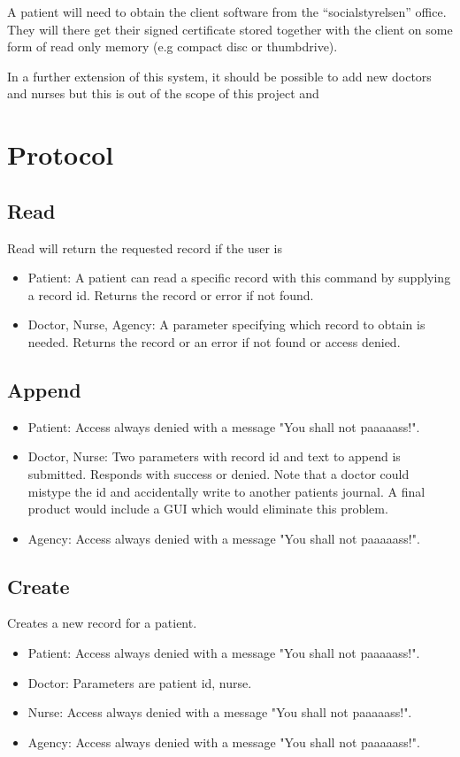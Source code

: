 \documentclass[10pt, a4paper]{article}
\begin{document}
A patient will need to obtain the client software from the ``socialstyrelsen'' office. They will there get their signed certificate stored together with the client on some form of read only memory (e.g compact disc or thumbdrive).

In a further extension of this system, it should be possible to add new doctors and nurses but this is out of the scope
of this project and 


\section{Protocol}
\subsection{Read}
Read will return the requested record if the user is 
\begin{itemize}
	\item Patient: A patient can read a specific record with this command by supplying a record id. Returns the record or error if not found.
	\item Doctor, Nurse, Agency: A parameter specifying which record to obtain is needed. Returns the record or an error if not found or access denied.
\end{itemize}

\subsection{Append}
\begin{itemize}
\item Patient: Access always denied with a message "You shall not paaaaass!".
\item Doctor, Nurse: Two parameters with record id and text to append is submitted. Responds with success or denied. Note that a doctor could mistype the id and accidentally write to another patients journal. A final product would include a GUI which would eliminate this problem.
\item Agency: Access always denied with a message "You shall not paaaaass!".
\end{itemize}

\subsection{Create}
Creates a new record for a patient.
\begin{itemize}
\item Patient: Access always denied with a message "You shall not paaaaass!".
\item Doctor: Parameters are patient id, nurse.
\item Nurse: Access always denied with a message "You shall not paaaaass!".
\item Agency: Access always denied with a message "You shall not paaaaass!".
\end{itemize}
\end{document}
